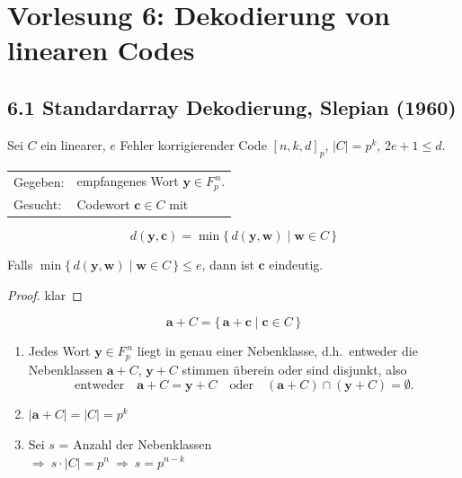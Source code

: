 \section{Vorlesung 6: Dekodierung von linearen Codes}
\subsection{6.1 Standardarray Dekodierung, Slepian (1960)}

Sei $C$ ein linearer, $e$ Fehler korrigierender Code $[n,k,d]_p$, $|C| = p^k$, $2e+1 \le d$.

\begin{tabular}{ll}
Gegeben: & empfangenes Wort $\mathbf{y} \in F_p^{\,n}$.\\
Gesucht: & Codewort $\mathbf{c} \in C$ mit
\end{tabular}
\[
  d(\mathbf{y},\mathbf{c}) = \min\{\, d(\mathbf{y},\mathbf{w}) \mid \mathbf{w} \in C \,\}
\]

\begin{satz}
Falls $\min\{\, d(\mathbf{y},\mathbf{w}) \mid \mathbf{w} \in C \,\} \le e$, dann ist $\mathbf{c}$ eindeutig.
\end{satz}
\begin{proof}
klar
\end{proof}

\begin{definition}
\[
  \mathbf{a} + C = \{\, \mathbf{a} + \mathbf{c} \mid \mathbf{c} \in C \,\}
\]
\end{definition}

\begin{satz}
\begin{enumerate}[label=(\arabic*)]
  \item Jedes Wort $\mathbf{y} \in F_p^{\,n}$ liegt in genau einer Nebenklasse,
  d.h.\ entweder die Nebenklassen $\mathbf{a}+C$, $\mathbf{y}+C$ stimmen überein oder sind disjunkt, also
  \[
    \text{entweder}\quad \mathbf{a}+C = \mathbf{y}+C \quad\text{oder}\quad (\mathbf{a}+C) \cap (\mathbf{y}+C) = \emptyset .
  \]
  \item $|\mathbf{a}+C| = |C| = p^k$
  \item Sei $s$ = Anzahl der Nebenklassen\\
  $\Rightarrow\ s \cdot |C| = p^n \ \Rightarrow\ s = p^{n-k}$
\end{enumerate}
\end{satz}


